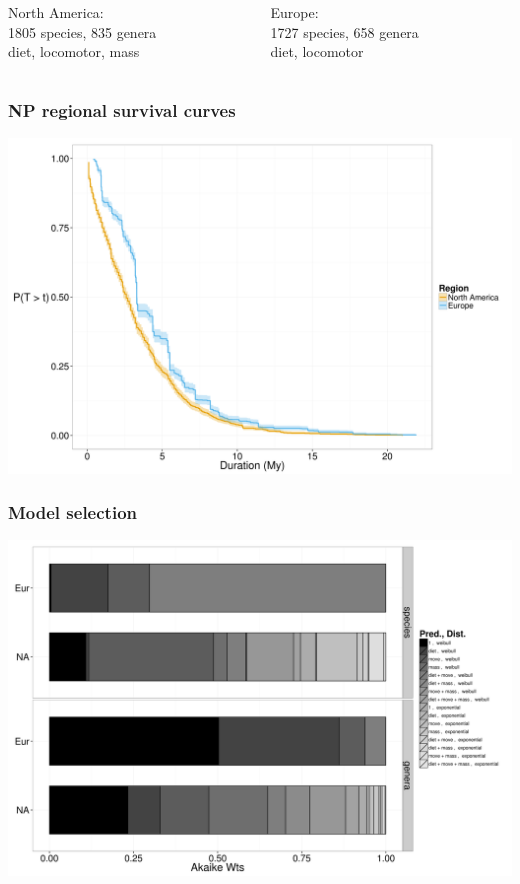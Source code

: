 \documentclass{beamer}
\begin{document}
\begin{frame}
  \vspace{0.2cm}

  \begin{columns}
    \begin{column}{0.5\textwidth}
      North America: \\1805 species, 835 genera \\
      diet, locomotor, mass      
    \end{column}
    \begin{column}{0.5\textwidth}
      Europe: \\1727 species, 658 genera\\
      diet, locomotor
    \end{column}
  \end{columns}

\end{frame}

\begin{frame}
  \frametitle{NP regional survival curves}

  \includegraphics[height=0.8\textheight,width=\textwidth,keepaspectratio=true]{figure/kms_region}

\end{frame}

\begin{frame}
  \frametitle{Model selection}

  \includegraphics[height=0.8\textheight,width=\textwidth,keepaspectratio=true]{figure/sel_wts}

\end{frame}
\end{document}
